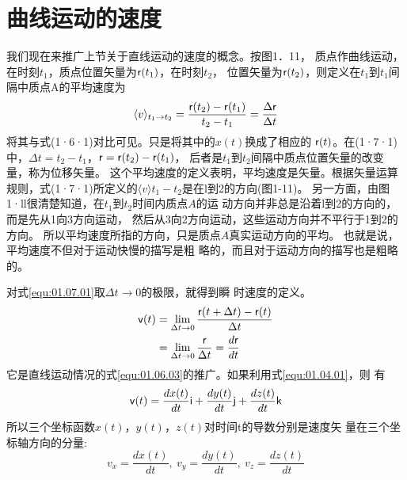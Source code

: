 \section{曲线运动的速度}
\label{sec:01.07}
    我们现在来推广上节关于直线运动的速度的概念。按图1．11，
质点作曲线运动，在时刻$t_1$，质点位置矢量为${\sf r}(t_1)$，在时刻$t_2$，
位置矢量为${\sf r}(t_2)$，则定义在$t_1$到$t_1$间隔中质点A的平均速度为
\begin{equation}\label{equ:01.07.01}
    \langle v \rangle_{t_1\rightarrow t_2}=\frac{{\sf r}(t_2)-{\sf r}(t_1)}{t_2-t_1}=\frac{\Delta {\sf r}}{\Delta t}
\end{equation}
将其与式(1·6·1)对比可见。只是将其中的$x(t)$换成了相应的
${\sf r}(t)$。在(1·7·1)中，$\Delta t=t_2-t_1$，${\sf r}={\sf r}(t_2)-{\sf r}(t_1)$，
后者是$t_1$到$t_2$间隔中质点位置矢量的改变量，称为位移矢量。
这个平均速度的定义表明，平均速度是矢量。根据矢量运算
规则，式(1·7·1)所定义的$\langle v\rangle t_1-t_2$是在l到2的方向(图1-11)。
另一方面，由图1·ll很清楚知道，在$t_1$到$t_2$时间内质点$A$的运
动方向并非总是沿着l到2的方向的，而是先从1向3方向运动，
然后从3向2方向运动，这些运动方向并不平行于1到2的方向。
所以平均速度所指的方向，只是质点$A$真实运动方向的平均。
也就是说，平均速度不但对于运动快慢的描写是粗
略的，而且对于运动方向的描写也是粗略的。

对式\eqref{equ:01.07.01}取$\Delta t \rightarrow 0$的极限，就得到瞬
时速度的定义。
\begin{equation}\label{equ:01.07.02}
    \begin{aligned}
        {\sf v}(t) &=\lim _{\Delta t \rightarrow 0} \frac{{\sf r}(t+\Delta t)-{\sf r}(t)}{\Delta t} \\
        &=\lim _{\Delta t \rightarrow 0} \frac{{\sf r}}{\Delta t} =\frac{d{\sf r}}{dt}
    \end{aligned}
\end{equation}
它是直线运动情况的式\eqref{equ:01.06.03}的推广。如果利用式\eqref{equ:01.04.01}，则
有
\begin{equation}\label{equ:01.07.03}
    {\sf v}(t)=\frac{d x(t)}{d t} {\sf i}+\frac{d y(t)}{d t} {\sf j}+\frac{d z(t)}{d t} {\sf k}
\end{equation}
所以三个坐标函数$x(t)$，$y(t)$，$z(t)$对时间t的导数分别是速度矢
量在三个坐标轴方向的分量:
\begin{equation}\label{equ:01.07.04}
    v_{x}=\frac{d x(t)}{d t}, ~ v_{y}=\frac{d y(t)}{d t}, ~ v_{z}=\frac{d z(t)}{d t}
\end{equation}

